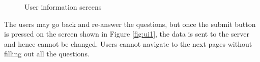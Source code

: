 \begin{figure}[htp]
  \hspace{2em}
  \caption{User information screens}
  \label{fig:ui}
\end{figure}

The users may go back and re-answer the questions, but once the submit button is pressed on the screen shown in Figure \ref{fig:ui1}, the data is sent to the server
and hence cannot be changed. Users cannot navigate to the next pages without filling out all the questions.

